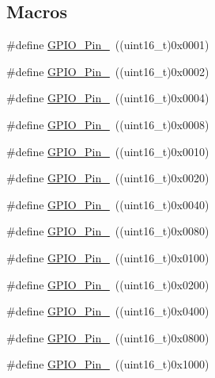 \subsection*{Macros}
\begin{DoxyCompactItemize}
\item 
\#define \hyperlink{group___g_p_i_o__pins__define_gab305b8d1be9f89bf2b4a05589b456049}{G\+P\+I\+O\+\_\+\+Pin\+\_}~((uint16\+\_\+t)0x0001)
\item 
\#define \hyperlink{group___g_p_i_o__pins__define_ga29db642c26f1fa0fffc3ecadcd30f82b}{G\+P\+I\+O\+\_\+\+Pin\+\_}~((uint16\+\_\+t)0x0002)
\item 
\#define \hyperlink{group___g_p_i_o__pins__define_gabdf6630324b2f99360537a310687187c}{G\+P\+I\+O\+\_\+\+Pin\+\_}~((uint16\+\_\+t)0x0004)
\item 
\#define \hyperlink{group___g_p_i_o__pins__define_ga763c6544859dbe28cd3f8ad820045556}{G\+P\+I\+O\+\_\+\+Pin\+\_}~((uint16\+\_\+t)0x0008)
\item 
\#define \hyperlink{group___g_p_i_o__pins__define_gacbf04d09b954606cdcc55eb2e81780e3}{G\+P\+I\+O\+\_\+\+Pin\+\_}~((uint16\+\_\+t)0x0010)
\item 
\#define \hyperlink{group___g_p_i_o__pins__define_ga32dbe930f52ce5ab60190c65e9dc741e}{G\+P\+I\+O\+\_\+\+Pin\+\_}~((uint16\+\_\+t)0x0020)
\item 
\#define \hyperlink{group___g_p_i_o__pins__define_gaf047899d873f27c2db9f50b342e35a58}{G\+P\+I\+O\+\_\+\+Pin\+\_}~((uint16\+\_\+t)0x0040)
\item 
\#define \hyperlink{group___g_p_i_o__pins__define_ga7346b6ce5507bd28a7a79e7dcc816c08}{G\+P\+I\+O\+\_\+\+Pin\+\_}~((uint16\+\_\+t)0x0080)
\item 
\#define \hyperlink{group___g_p_i_o__pins__define_gac891f0984dc64af3567577fbf13ab304}{G\+P\+I\+O\+\_\+\+Pin\+\_}~((uint16\+\_\+t)0x0100)
\item 
\#define \hyperlink{group___g_p_i_o__pins__define_gaad1891082d5d6bcac06c2729a9fdd2f0}{G\+P\+I\+O\+\_\+\+Pin\+\_}~((uint16\+\_\+t)0x0200)
\item 
\#define \hyperlink{group___g_p_i_o__pins__define_ga726af6407ba60ac60f02057227c2d348}{G\+P\+I\+O\+\_\+\+Pin\+\_}~((uint16\+\_\+t)0x0400)
\item 
\#define \hyperlink{group___g_p_i_o__pins__define_ga5139d5bc3d15784ae7794ed2ae1ff767}{G\+P\+I\+O\+\_\+\+Pin\+\_}~((uint16\+\_\+t)0x0800)
\item 
\#define \hyperlink{group___g_p_i_o__pins__define_gada91257dcaab2c86f75fbd8e4b52b98c}{G\+P\+I\+O\+\_\+\+Pin\+\_}~((uint16\+\_\+t)0x1000)

\end{DoxyCompactItemize}
